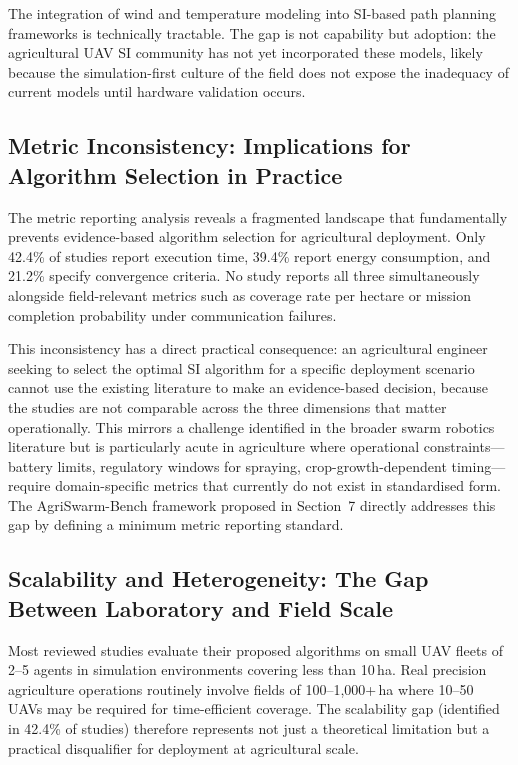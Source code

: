 \documentclass[review,3p,times]{elsarticle}
\begin{document}
The integration of wind and temperature modeling into SI-based path planning frameworks is technically tractable. The gap is not capability but adoption: the agricultural UAV SI community has not yet incorporated these models, likely because the simulation-first culture of the field does not expose the inadequacy of current models until hardware validation occurs.

\subsection{Metric Inconsistency: Implications for Algorithm Selection in Practice}
\label{sec:metrics_disc}

The metric reporting analysis reveals a fragmented landscape that fundamentally prevents evidence-based algorithm selection for agricultural deployment. Only 42.4\% of studies report execution time, 39.4\% report energy consumption, and 21.2\% specify convergence criteria. No study reports all three simultaneously alongside field-relevant metrics such as coverage rate per hectare or mission completion probability under communication failures.

This inconsistency has a direct practical consequence: an agricultural engineer seeking to select the optimal SI algorithm for a specific deployment scenario cannot use the existing literature to make an evidence-based decision, because the studies are not comparable across the three dimensions that matter operationally. This mirrors a challenge identified in the broader swarm robotics literature \cite{puente2022,sharma2022} but is particularly acute in agriculture where operational constraints---battery limits, regulatory windows for spraying, crop-growth-dependent timing---require domain-specific metrics that currently do not exist in standardised form. The AgriSwarm-Bench framework proposed in Section~7 directly addresses this gap by defining a minimum metric reporting standard.

\subsection{Scalability and Heterogeneity: The Gap Between Laboratory and Field Scale}

Most reviewed studies evaluate their proposed algorithms on small UAV fleets of 2--5 agents in simulation environments covering less than 10\,ha. Real precision agriculture operations routinely involve fields of 100--1,000+\,ha where 10--50 UAVs may be required for time-efficient coverage. The scalability gap (identified in 42.4\% of studies) therefore represents not just a theoretical limitation but a practical disqualifier for deployment at agricultural scale.
\end{document}
